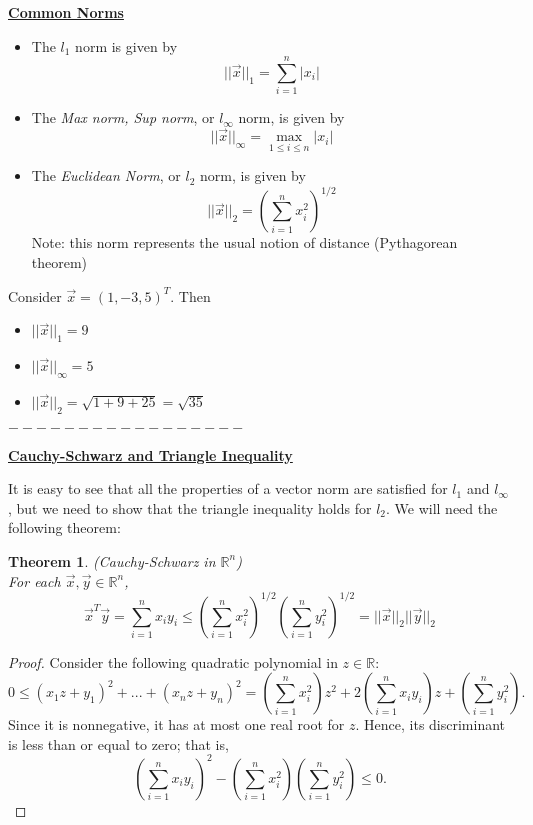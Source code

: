 \documentclass[12pt]{article}
\newcommand{\vecx}{\ensuremath{\vec{x}}}
\newcommand{\vecy}{\ensuremath{\vec{y}}}
\newtheorem{theorem}{Theorem}
\newenvironment{example}[1][Example]{\begin{trivlist}
\item[\hskip \labelsep {\bfseries #1}]}{\end{trivlist}}
\begin{document}
\underline{\textbf{Common Norms}}

\begin{itemize}
\item The $l_1$ norm is given by
\[
||\vecx||_1 = \sum_{i=1}^n|x_i|
\]
\item The \textit{Max norm, Sup norm}, or $l_\infty$ norm, is given by
\[
||\vecx||_\infty = \max_{1\leq i\leq n} |x_i|
\]
\item The \textit{Euclidean Norm}, or $l_2$ norm, is given by
\[
||\vecx||_2 = \left(\sum_{i=1}^n x_i^2\right)^{1/2}
\]
Note: this norm represents the usual notion of distance (Pythagorean theorem)
\end{itemize}

\begin{example}
Consider $\vecx = (1,-3,5)^T$. Then
\begin{itemize}
\item[i.] $||\vecx||_1 = 9$
\item[ii.] $||\vecx||_\infty = 5$
\item[iii.] $||\vecx||_2 = \sqrt{1+9+25} = \sqrt{35}$
\end{itemize}
\end{example}

\begin{center}$-----------------$\end{center}

\vspace*{1em}
\underline{\textbf{Cauchy-Schwarz and Triangle Inequality}}

It is easy to see that all the properties of a vector norm are satisfied for $l_1$ and $l_\infty$, but we need to show that the triangle inequality holds for $l_2$.
We will need the following theorem:

\vspace*{1em}

\begin{theorem}
(Cauchy-Schwarz in $\mathbb{R}^n$)\\
For each $\vecx,\vecy \in \mathbb{R}^n$,
\[
\vecx^T\vecy = \sum_{i=1}^n x_iy_i\leq\left(\sum_{i=1}^nx_i^2\right)^{1/2}\left(\sum_{i=1}^ny_i^2\right)^{1/2} = ||\vecx||_2||\vecy||_2
\]
\end{theorem}
\begin{proof}
Consider the following quadratic polynomial in $z\in\mathbb{R}$:
\[
0\leq(x_1z+y_1)^2+...+(x_nz+y_n)^2 = \left(\sum_{i=1}^nx_i^2\right)z^2 + 2\left(\sum_{i=1}^nx_iy_i\right)z + \left(\sum_{i=1}^ny_i^2\right).
\]
Since it is nonnegative, it has at most one real root for $z$.
Hence, its discriminant is less than or equal to zero; that is,
\[
\left(\sum_{i=1}^nx_iy_i\right)^2-\left(\sum_{i=1}^nx_i^2\right)\left(\sum_{i=1}^ny_i^2\right)\leq 0.
\]
\end{proof}
\end{document}
